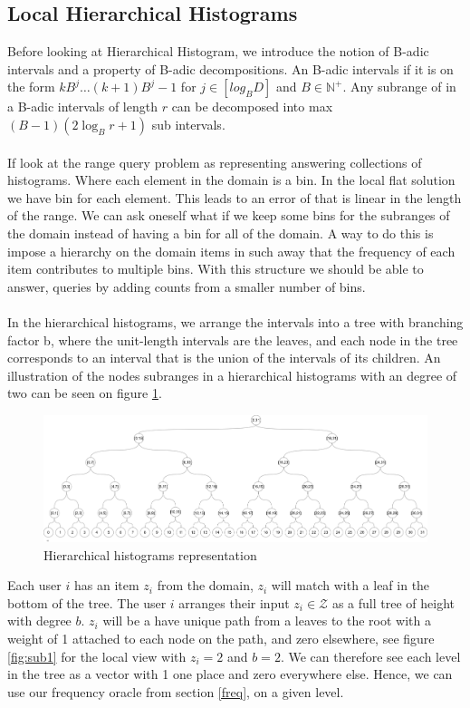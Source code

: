 \documentclass[11pt]{article}
\theoremstyle{definition}
\begin{document}
\subsection{Local Hierarchical Histograms}
Before looking at Hierarchical Histogram, we introduce the notion of B-adic intervals and a property of B-adic decompositions. An B-adic intervals if it is on the form  $k B^{j} \ldots(k+1) B^{j}-1$ for $j\in [log_BD]$ and $B\in\mathbb{N}^+$. Any subrange of in a B-adic intervals of length $r$  can be decomposed into max  $(B-1)\left(2 \log _{B} r+1\right)$ sub intervals. \\ \\
If look at the range query problem as representing answering collections of histograms. Where each element in the domain is a bin. In the local flat solution we have bin for each element. This leads to an error of that is linear in the length of the range. We can ask oneself what if we keep some bins for the subranges of the domain instead of having a bin for all of the domain. A way to do this is impose a hierarchy on the domain items in such away that the frequency of each item contributes to multiple bins. With this structure we should be able to answer, queries by adding counts from a smaller number of bins. \\ \\
In the hierarchical histograms, we arrange the intervals into a tree with branching factor b, where the unit-length intervals are the leaves, and each node in the tree corresponds to an interval that is the union of the intervals of its children. An illustration of the nodes subranges in a hierarchical histograms with an degree of two can be seen on figure \ref{fig:disjoint}.
\begin{figure}[H]
    \centering
    \includegraphics[width=.8\linewidth]{figures/disjoint_tree.png}
    \caption{Hierarchical histograms representation}
    \label{fig:disjoint}
\end{figure}
Each user $i$ has an item $z_i$ from the domain, $z_i$ will match with a leaf in the bottom of the tree. The user $i$ arranges their input $z_i\in \mathcal{Z}$ as a full tree of height with degree $b$. $z_i$ will be a have unique path from a leaves to the root with a weight of 1 attached to each node on the path, and zero elsewhere, see figure \ref{fig:sub1} for the local view with  $z_i=2$ and $b=2$.  We can therefore see each level in the tree as a vector with 1 one place and zero everywhere else. Hence, we can use our frequency oracle from section \ref{freq}, on a given level.  \\ \\
\end{document}
